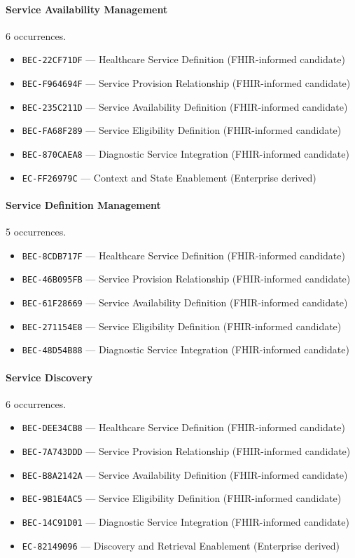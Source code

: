 \documentclass[11pt,a4paper,openany]{book}
\begin{document}
\paragraph{Service Availability Management} 6 occurrences.\par
\begin{itemize}
\item \texttt{BEC-22CF71DF} --- Healthcare Service Definition (FHIR-informed candidate)
\item \texttt{BEC-F964694F} --- Service Provision Relationship (FHIR-informed candidate)
\item \texttt{BEC-235C211D} --- Service Availability Definition (FHIR-informed candidate)
\item \texttt{BEC-FA68F289} --- Service Eligibility Definition (FHIR-informed candidate)
\item \texttt{BEC-870CAEA8} --- Diagnostic Service Integration (FHIR-informed candidate)
\item \texttt{EC-FF26979C} --- Context and State Enablement (Enterprise derived)
\end{itemize}
\paragraph{Service Definition Management} 5 occurrences.\par
\begin{itemize}
\item \texttt{BEC-8CDB717F} --- Healthcare Service Definition (FHIR-informed candidate)
\item \texttt{BEC-46B095FB} --- Service Provision Relationship (FHIR-informed candidate)
\item \texttt{BEC-61F28669} --- Service Availability Definition (FHIR-informed candidate)
\item \texttt{BEC-271154E8} --- Service Eligibility Definition (FHIR-informed candidate)
\item \texttt{BEC-48D54B88} --- Diagnostic Service Integration (FHIR-informed candidate)
\end{itemize}
\paragraph{Service Discovery} 6 occurrences.\par
\begin{itemize}
\item \texttt{BEC-DEE34CB8} --- Healthcare Service Definition (FHIR-informed candidate)
\item \texttt{BEC-7A743DDD} --- Service Provision Relationship (FHIR-informed candidate)
\item \texttt{BEC-B8A2142A} --- Service Availability Definition (FHIR-informed candidate)
\item \texttt{BEC-9B1E4AC5} --- Service Eligibility Definition (FHIR-informed candidate)
\item \texttt{BEC-14C91D01} --- Diagnostic Service Integration (FHIR-informed candidate)
\item \texttt{EC-82149096} --- Discovery and Retrieval Enablement (Enterprise derived)
\end{itemize}
\end{document}
